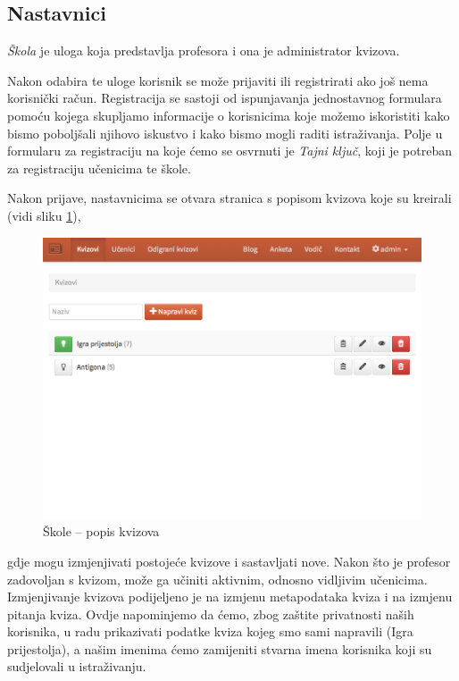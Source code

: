 \documentclass{scrreprt}
\begin{document}
\subsection{Nastavnici}

\emph{Škola} je uloga koja predstavlja profesora i ona je administrator kvizova.

Nakon odabira te uloge korisnik se može prijaviti ili registrirati ako još nema
korisnički račun. Registracija se sastoji od ispunjavanja jednostavnog formulara
pomoću kojega skupljamo informacije o korisnicima koje možemo iskoristiti kako
bismo poboljšali njihovo iskustvo i kako bismo mogli raditi istraživanja. Polje
u formularu za registraciju na koje ćemo se osvrnuti je \emph{Tajni ključ}, koji
je potreban za registraciju učenicima te škole.

Nakon prijave, nastavnicima se otvara stranica s popisom kvizova koje su
kreirali (vidi sliku \ref{fig:school/quizzes}),

\begin{figure}[H]
  \includegraphics[width=\textwidth, clip=true, trim=0 10cm 0 0, fbox]{school/quizzes}
  \caption{Škole -- popis kvizova}
  \label{fig:school/quizzes}
\end{figure}

gdje mogu izmjenjivati postojeće kvizove i sastavljati nove. Nakon što je
profesor zadovoljan s kvizom, može ga učiniti aktivnim, odnosno vidljivim
učenicima. Izmjenjivanje kvizova podijeljeno je na izmjenu metapodataka kviza i
na izmjenu pitanja kviza. Ovdje napominjemo da ćemo, zbog zaštite privatnosti
naših korisnika, u radu prikazivati podatke kviza kojeg smo sami napravili
(Igra prijestolja), a našim imenima ćemo zamijeniti stvarna imena korisnika
koji su sudjelovali u istraživanju.
\end{document}
